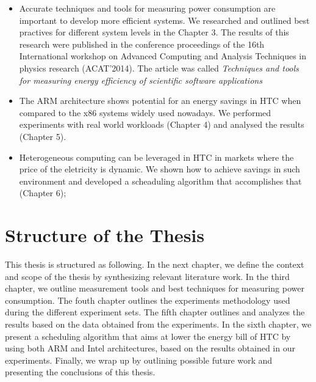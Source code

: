 \begin{itemize}
  \item Accurate techniques and tools for measuring power consumption are important to develop more efficient systems. We researched and outlined best practives for different system levels in the Chapter 3. The results of this research were published in the conference proceedings of the 16th International workshop on Advanced Computing and Analysis Techniques in physics research (ACAT'2014). The article was called \textit{Techniques and tools for measuring energy efficiency of scientific software applications}

  \item The ARM architecture shows potential for an energy savings in HTC when compared to the x86 systems widely used nowadays. We performed experiments with real world workloads (Chapter 4) and analysed the results (Chapter 5). 

  \item Heterogeneous computing can be leveraged in HTC in markets where the price of the eletricity is dynamic. We shown how to achieve savings in such environment and developed a scheaduling algorithm that accomplishes that (Chapter 6);
\end{itemize}



\section{Structure of the Thesis}
This thesis is structured as following. In the next chapter, we define the context and scope
of the thesis by synthesizing relevant literature work. In the third chapter, we
outline measurement tools and best techniques for measuring power consumption. The fouth chapter outlines the
experiments methodology used during the different experiment sets. The fifth chapter outlines and analyzes the results based on
the data obtained from the experiments. In the sixth chapter, we present a scheduling algorithm that aims at lower the energy bill of HTC by using both ARM and Intel architectures, based on the results obtained in our experiments. Finally, we wrap up by outlining possible future work and presenting the
conclusions of this thesis.
